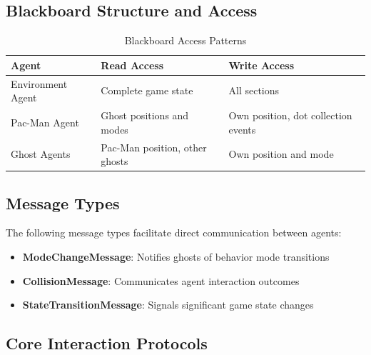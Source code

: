 \documentclass[a4paper, 11pt]{article}
\begin{document}
\subsection{Blackboard Structure and Access}

\begin{table}[h]
\centering
\caption{Blackboard Access Patterns}
\begin{tabular}{|p{3cm}|p{5.5cm}|p{5.5cm}|}
\hline
\textbf{Agent} & \textbf{Read Access} & \textbf{Write Access} \\
\hline
Environment Agent & Complete game state & All sections \\
\hline
Pac-Man Agent & Ghost positions and modes & Own position, dot collection events \\
\hline
Ghost Agents & Pac-Man position, other ghosts & Own position and mode \\
\hline
\end{tabular}
\end{table}

\subsection{Message Types}

The following message types facilitate direct communication between agents:

\begin{itemize}
    \item \textbf{ModeChangeMessage}: Notifies ghosts of behavior mode transitions
    \item \textbf{CollisionMessage}: Communicates agent interaction outcomes
    \item \textbf{StateTransitionMessage}: Signals significant game state changes
\end{itemize}

\clearpage

\subsection{Core Interaction Protocols}
\end{document}
